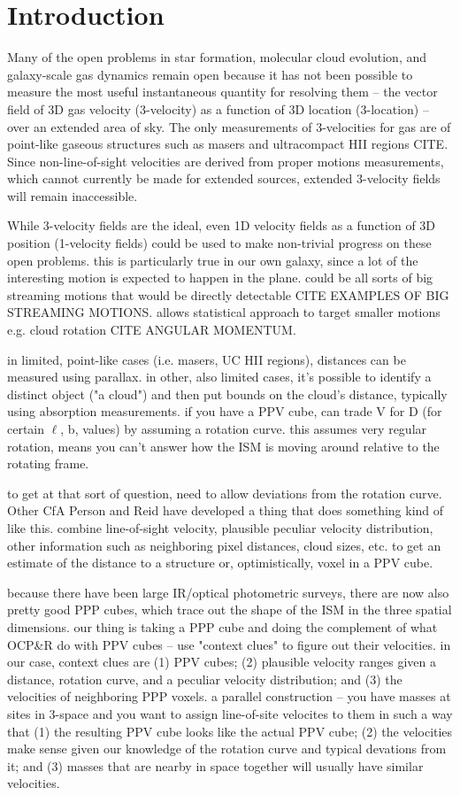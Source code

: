 \section{Introduction}
Many of the open problems in star formation, molecular cloud evolution, and galaxy-scale gas dynamics remain open because it has not been possible to measure the most useful instantaneous quantity for resolving them -- the vector field of 3D gas velocity (3-velocity) as a function of 3D location (3-location) -- over an extended area of sky. 
The only measurements of 3-velocities for gas are of point-like gaseous structures such as masers and ultracompact HII regions CITE.   
Since non-line-of-sight velocities are derived from proper motions measurements, which cannot currently be made for extended sources, extended 3-velocity fields will remain inaccessible.

While 3-velocity fields are the ideal, even 1D velocity fields as a function of 3D position (1-velocity fields) could be used to make non-trivial progress on these open problems.
this is particularly true in our own galaxy, since a lot of the interesting motion is expected to happen in the plane.
could be all sorts of big streaming motions that would be directly detectable CITE EXAMPLES OF BIG STREAMING MOTIONS.
allows statistical approach to target smaller motions e.g. cloud rotation CITE ANGULAR MOMENTUM.

in limited, point-like cases (i.e. masers, UC HII regions), distances can be measured using parallax.
in other, also limited cases, it's possible to identify a distinct object ("a cloud") and then put bounds on the cloud's distance, typically using absorption measurements. 
if you have a PPV cube, can trade V for D (for certain $\ell$, b, values) by assuming a rotation curve. 
this assumes very regular rotation, means you can't answer how the ISM is moving around relative to the rotating frame.

to get at that sort of question, need to allow deviations from the rotation curve.
Other CfA Person and Reid have developed a thing that does something kind of like this. 
combine line-of-sight velocity, plausible peculiar velocity distribution, other information such as neighboring pixel distances, cloud sizes, etc. to get an estimate of the distance to a structure or, optimistically, voxel in a PPV cube.

because there have been large IR/optical photometric surveys, there are now also pretty good PPP cubes, which trace out the shape of the ISM in the three spatial dimensions. 
our thing is taking a PPP cube and doing the complement of what OCP\&R do with PPV cubes -- use "context clues" to figure out their velocities.
in our case, context clues are (1) PPV cubes; (2) plausible velocity ranges given a distance, rotation curve, and a peculiar velocity distribution; and (3) the velocities of neighboring PPP voxels. 
a parallel construction -- you have masses at sites in 3-space and you want to assign line-of-site velocites to them in such a way that (1) the resulting PPV cube looks like the actual PPV cube; (2) the velocities make sense given our knowledge of the rotation curve and typical devations from it; and (3) masses that are nearby in space together will usually have similar velocities.

